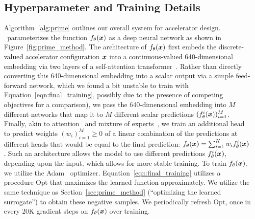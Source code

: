 \subsection{Hyperparameter and Training Details}
\label{sec:prime_practical_implementation}
%
Algorithm~\ref{alg:prime} outlines our overall system for accelerator design.
%
\primemethodname\ parameterizes the function $f_\theta({\boldsymbol{x}})$ as a deep neural network as shown in Figure~\ref{fig:prime_method}. 
%
The architecture of $f_\theta({\boldsymbol{x}})$ first embeds the discrete-valued accelerator configuration ${\boldsymbol{x}}$ into a continuous-valued 640-dimensional embedding via two layers of a self-attention transformer~\citep{vaswani2017attention}. 
%
Rather than directly converting this 640-dimensional embedding into a scalar output via a simple feed-forward network, which we found a bit unstable to train with Equation~\ref{eqn:final_training}, possibly due to the presence of competing objectives for a comparison), we pass the 640-dimensional embedding into $M$ different networks that map it to $M$ different scalar predictions $(f^i_\theta({\boldsymbol{x}}))_{i=1}^M$. 
%
Finally, akin to attention~\citep{vaswani2017attention} and mixture of experts~\citep{shazeer2017outrageously}, we train an additional head to predict weights $(w_i)_{i=1}^M \geq 0$ of a linear combination of the predictions at different heads that would be equal to the final prediction: $f_\theta({\boldsymbol{x}}) = \sum_{i=1}^K w_i f^i_\theta({\boldsymbol{x}})$.
%
Such an architecture allows the model to use different predictions $f^i_\theta({\boldsymbol{x}})$, depending upon the input, which allows for more stable training. To train $f_\theta({\boldsymbol{x}})$, we utilize the Adam~\citep{kingma2014adam} optimizer.
%
Equation~\ref{eqn:final_training} utilizes a procedure $\mathrm{Opt}$ that maximizes the learned function approximately. We utilize the same technique as Section~\ref{sec:prime_method} (``optimizing the learned surrogate'') to obtain these negative samples.
%
We periodically refresh $\mathrm{Opt}$, once in every 20K gradient steps on $f_\theta({\boldsymbol{x}})$ over training.
